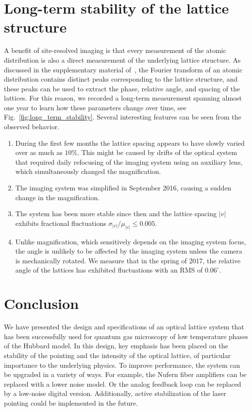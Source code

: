 \documentclass[twocolumn,aps,pra,showpacs,preprintnumbers,bibnotes]{revtex4-1}
\begin{document}
\section{Long-term stability of the lattice structure}
A benefit of site-resolved imaging is that every measurement of the atomic distribution is also a direct measurement of the underlying lattice structure.
As discussed in the supplementary material of~\cite{Parsons2016, Greif2016}, the Fourier transform of an atomic distribution contains distinct peaks corresponding to the lattice structure, and these peaks can be used to extract the phase, relative angle, and spacing of the lattices.
For this reason, we recorded a long-term measurement spanning almost one year to learn how these parameters change over time, see Fig.~\ref{fig:long_term_stability}.
Several interesting features can be seen from the observed behavior.
\begin{enumerate}
  \item During the first few months the lattice spacing appears to have slowly varied over as much as $10\%$.
    This might be caused by drifts of the optical system that required daily refocusing of the imaging system using an auxiliary lens, which simultaneously changed the magnification.
  \item The imaging system was simplified in September 2016, causing a sudden change in the magnification.
  \item The system has been more stable since then and the lattice spacing $|v|$ exhibits fractional fluctuations $\sigma_{|v|}/\mu_{|v|}\leq 0.005$.
  \item Unlike magnification, which sensitively depends on the imaging system focus, the angle is unlikely to be affected by the imaging system unless the camera is mechanically rotated. We measure that in the spring of 2017, the relative angle of the lattices has exhibited fluctuations with an RMS of $0.06^\circ$.
\end{enumerate}



\section{Conclusion}
We have presented the design and specifications of an optical lattice system that has been successfully used for quantum gas microscopy of low temperature phases of the Hubbard model.
In this design, key emphasis has been placed on the stability of the pointing and the intensity of the optical lattice, of particular importance to the underlying physics.
To improve performance, the system can be upgraded in a variety of ways. For example, the Nufern fiber amplifiers can be replaced with a lower noise model. Or the analog feedback loop can be replaced by a low-noise digital version. Additionally, active stabilization of the laser pointing could be implemented in the future.


\end{document}
